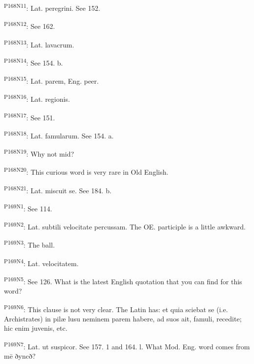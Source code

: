 \textsuperscript{P168N11}: Lat. peregrini. See 152.

\textsuperscript{P168N12}: See 162.

\textsuperscript{P168N13}: Lat. lavacrum.

\textsuperscript{P168N14}: See 154. b.

\textsuperscript{P168N15}: Lat. parem, Eng. peer.

\textsuperscript{P168N16}: Lat. regionis.

\textsuperscript{P168N17}: See 151.

\textsuperscript{P168N18}: Lat. famularum. See 154. a.

\textsuperscript{P168N19}: Why not mid?

\textsuperscript{P168N20}: This curious word is very rare in Old English.

\textsuperscript{P168N21}: Lat. miscuit se. See 184. b.

\textsuperscript{P169N1}: See 114.

\textsuperscript{P169N2}: Lat. subtili velocitate percussam. The OE. participle is a little awkward.

\textsuperscript{P169N3}: The ball.

\textsuperscript{P169N4}: Lat. velocitatem.

\textsuperscript{P169N5}: See 126. What is the latest English quotation that you can find for this word?

\textsuperscript{P169N6}: This clause is not very clear. The Latin has: et quia sciebat se (i.e. Archistrates) in pilæ lusu neminem parem habere, ad suos ait, famuli, recedite; hic enim juvenis, etc.

\textsuperscript{P169N7}: Lat. ut suspicor. See 157. 1 and 164. l. What Mod. Eng. word comes from mē ðyncð?

